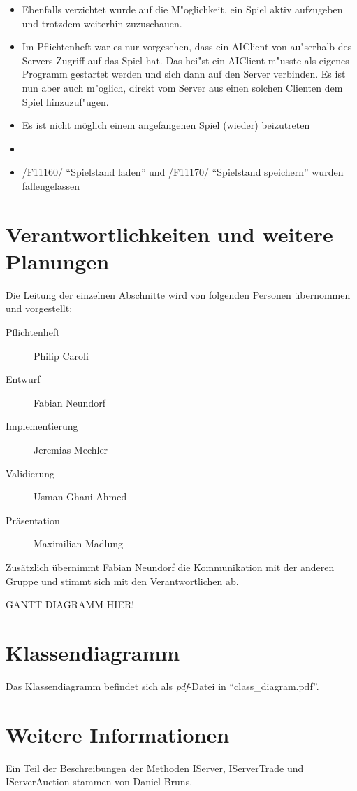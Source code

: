 \documentclass[a4paper,10pt]{article}
\begin{document}
\begin{itemize}
\item Ebenfalls verzichtet wurde auf die M"oglichkeit, ein Spiel aktiv aufzugeben und trotzdem weiterhin zuzuschauen.
\item Im Pflichtenheft war es nur vorgesehen, dass ein AIClient von au"serhalb des Servers Zugriff auf das Spiel hat. Das hei"st ein AIClient m"usste als eigenes Programm gestartet werden und sich dann auf den Server verbinden. Es ist nun aber auch m"oglich, direkt vom Server aus einen solchen Clienten dem Spiel hinzuzuf"ugen.
\item Es ist nicht möglich einem angefangenen Spiel (wieder) beizutreten
\item 
\item /F11160/ "`Spielstand laden"' und /F11170/ "`Spielstand speichern"' wurden fallengelassen 
\end{itemize}
\section{Verantwortlichkeiten und weitere Planungen}
Die Leitung der einzelnen Abschnitte wird von folgenden Personen übernommen und vorgestellt:
\begin{description}
\item[Pflichtenheft] Philip Caroli
\item[Entwurf] Fabian Neundorf
\item[Implementierung] Jeremias Mechler
\item[Validierung] Usman Ghani Ahmed
\item[Präsentation] Maximilian Madlung
\end{description}
Zusätzlich übernimmt Fabian Neundorf die Kommunikation mit der anderen Gruppe und stimmt sich mit den Verantwortlichen ab.

GANTT DIAGRAMM HIER!
\section{Klassendiagramm}
Das Klassendiagramm befindet sich als \textit{pdf}-Datei in "`class\_diagram.pdf"'.
\section{Weitere Informationen}
Ein Teil der Beschreibungen der Methoden IServer, IServerTrade und IServerAuction stammen von Daniel Bruns.
\end{document}
